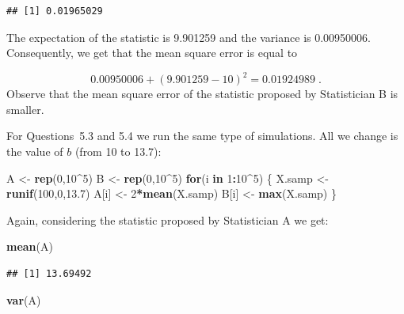 \documentclass[
]{krantz}
\makeatletter
\newenvironment{Shaded}{\begin{snugshade}}{\end{snugshade}}
\newcommand{\ControlFlowTok}[1]{\textcolor[rgb]{0.13,0.29,0.53}{\textbf{#1}}}
\newcommand{\DecValTok}[1]{\textcolor[rgb]{0.00,0.00,0.81}{#1}}
\newcommand{\FloatTok}[1]{\textcolor[rgb]{0.00,0.00,0.81}{#1}}
\newcommand{\KeywordTok}[1]{\textcolor[rgb]{0.13,0.29,0.53}{\textbf{#1}}}
\newcommand{\NormalTok}[1]{#1}
\newcommand{\OperatorTok}[1]{\textcolor[rgb]{0.81,0.36,0.00}{\textbf{#1}}}
\newcommand{\StringTok}[1]{\textcolor[rgb]{0.31,0.60,0.02}{#1}}
\newenvironment{kframe}{%
\medskip{}
\setlength{\fboxsep}{.8em}
 \def\at@end@of@kframe{}%
 \ifinner\ifhmode%
  \def\at@end@of@kframe{\end{minipage}}%
  \begin{minipage}{\columnwidth}%
 \fi\fi%
 \def\FrameCommand##1{\hskip\@totalleftmargin \hskip-\fboxsep
 \colorbox{shadecolor}{##1}\hskip-\fboxsep
     \hskip-\linewidth \hskip-\@totalleftmargin \hskip\columnwidth}%
 \MakeFramed {\advance\hsize-\width
   \@totalleftmargin\z@ \linewidth\hsize
   \@setminipage}}%
 {\par\unskip\endMakeFramed%
 \at@end@of@kframe}
\renewenvironment{Shaded}{\begin{kframe}}{\end{kframe}}
\theoremstyle{definition}
\theoremstyle{definition}
\theoremstyle{definition}
\theoremstyle{remark}
\makeatother
\begin{document}
\begin{verbatim}
## [1] 0.01965029
\end{verbatim}

The expectation of the statistic is 9.901259 and the variance is
0.00950006. Consequently, we get that the mean square error is equal to

\[0.00950006 + (9.901259 - 10)^2 = 0.01924989\;.\] Observe that the mean
square error of the statistic proposed by Statistician B is smaller.

For Questions~5.3 and 5.4 we run the same type of simulations. All we
change is the value of \(b\) (from 10 to 13.7):

\begin{Shaded}
\begin{Highlighting}[]
\NormalTok{A <-}\StringTok{ }\KeywordTok{rep}\NormalTok{(}\DecValTok{0}\NormalTok{,}\DecValTok{10}\OperatorTok{^}\DecValTok{5}\NormalTok{)}
\NormalTok{B <-}\StringTok{ }\KeywordTok{rep}\NormalTok{(}\DecValTok{0}\NormalTok{,}\DecValTok{10}\OperatorTok{^}\DecValTok{5}\NormalTok{)}
\ControlFlowTok{for}\NormalTok{(i }\ControlFlowTok{in} \DecValTok{1}\OperatorTok{:}\DecValTok{10}\OperatorTok{^}\DecValTok{5}\NormalTok{) \{}
\NormalTok{  X.samp <-}\StringTok{ }\KeywordTok{runif}\NormalTok{(}\DecValTok{100}\NormalTok{,}\DecValTok{0}\NormalTok{,}\FloatTok{13.7}\NormalTok{)}
\NormalTok{  A[i] <-}\StringTok{ }\DecValTok{2}\OperatorTok{*}\KeywordTok{mean}\NormalTok{(X.samp)}
\NormalTok{  B[i] <-}\StringTok{ }\KeywordTok{max}\NormalTok{(X.samp)}
\NormalTok{\}}
\end{Highlighting}
\end{Shaded}

Again, considering the statistic proposed by Statistician A we get:

\begin{Shaded}
\begin{Highlighting}[]
\KeywordTok{mean}\NormalTok{(A)}
\end{Highlighting}
\end{Shaded}

\begin{verbatim}
## [1] 13.69492
\end{verbatim}

\begin{Shaded}
\begin{Highlighting}[]
\KeywordTok{var}\NormalTok{(A)}
\end{Highlighting}
\end{Shaded}
\end{document}
